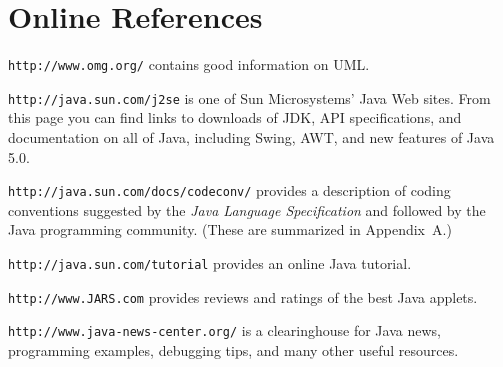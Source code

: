 \section*{Online References}
\label{online-references}
\begin{BL} 

\item  {\tt http://www.omg.org/} contains good information on UML.

\item  {\tt http://java.sun.com/j2se} is one of Sun
Microsystems' Java Web sites.  From this page you can find links
to downloads of JDK, API specifications, and documentation
on all of Java, including Swing, AWT, and new features of
Java 5.0.

\item  {\tt http://java.sun.com/docs/codeconv/} provides a
description of coding conventions suggested by the {\it Java Language
Specification} and followed by the Java programming community.
(These are summarized in Appendix~A.)

\item  {\tt http://java.sun.com/tutorial} provides an online
Java tutorial.

\item  {\tt http://www.JARS.com} provides reviews and 
ratings of the best Java applets.

\item {\tt http://www.java-news-center.org/} is a clearinghouse for
Java news, programming examples, debugging tips, and many other useful
resources.

\end{BL}
%
